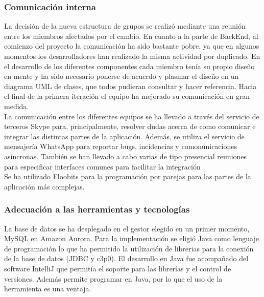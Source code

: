 \subsubsection{Comunicación interna}
La decisión de la nueva estructura de grupos se realizó mediante una reunión entre los miembros afectados por el cambio.
En cuanto a la parte de BackEnd, al comienzo del proyecto la comunicación ha sido bastante pobre, ya que en algunos momentos los desarrolladores han realizado la misma actividad por duplicado. En el desarrollo de los diferentes componentes cada miembro tenía su propio diseño en mente y ha sido necesario ponerse de acuerdo y plasmar el diseño en un diagrama UML de clases, que todos pudieran consultar y hacer referencia. Hacia el final de la primera iteración el equipo ha mejorado su comunicación en gran medida.
\\
La comunicación entre los diferentes equipos se ha llevado a través del servicio de terceros Skype para, principalmente, resolver dudas acerca de como comunicar e integrar las distintas partes de la aplicación. Además, se utiliza el servicio de mensajería WhatsApp para reportar bugs, incidencias y comonunicaciones asíncronas. También se han llevado a cabo varias de tipo presencial reuniones para especificar interfaces comunes para facilitar la integración
\\
Se ha utilizado Floobits para la programación por parejas para las partes de la aplicación más complejas.

\subsubsection{Adecuación a las herramientas y tecnologías}
La base de datos se ha desplegado en el gestor elegido en un primer momento, MySQL en Amazon Aurora. Para la implementación se eligió Java como lenguaje de programación lo que ha permitido la utilización de librerias para la conexión de la base de datos (JDBC y c3p0). El desarrollo en Java fue acompañado del software IntelliJ que permitía el soporte para las librerías y el control de versiones. Además permite programar en Java, por lo que el uso de la herramienta es una ventaja.
\\

